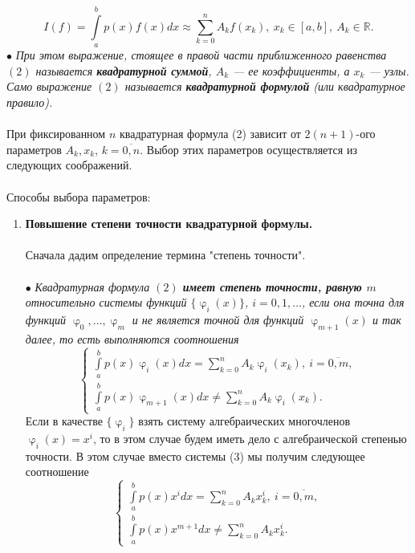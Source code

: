 \documentclass[a4paper, 12pt]{report}
\numberwithin{equation}{section}
\newcommand{\Rm}{\mathbb{R}}
\renewcommand{\varphi}{\upvarphi}
\begin{document}
	 \begin{equation}
	 	I (f) = \int\limits_a^b p(x) f(x)dx \approx \sum_{k=0}^{n}A_k f(x_k),\ x_k\in[a,b],\ A_k\in \Rm.
	 \end{equation}
	 $\bullet$ \textit{При этом выражение, стоящее в правой части приближенного равенства $(2)$ называется \textbf{квадратурной суммой}, $A_k$ --- ее коэффициенты, а $x_k$ --- узлы. Само выражение $(2)$ называется \textbf{квадратурной формулой} (или квадратурное правило).}\\\\
	 При фиксированном $n$ квадратурная формула (2) зависит от $2(n+1)$-ого параметров $A_k, x_k$, $k=\overline{0,n}$. Выбор этих параметров осуществляется из следующих соображений.\\\\
	 Способы выбора параметров:
	 \begin{enumerate}
	 	\item \textbf{Повышение степени точности квадратурной формулы.}\\\\
	 	Сначала дадим определение термина "степень точности".\\\\
	 	$\bullet$ \textit{Квадратурная формула $(2)$ \textbf{имеет степень точности, равную $m$} относительно системы функций $\{\varphi_i(x)\}$, $i=0,1,\ldots$, если она точна для функций $\varphi_0,\ldots, \varphi_m$ и не является точной для функций $\varphi_{m+1}(x)$ и так далее, то есть выполняются соотношения} 
	 	\begin{equation}
	 		\begin{cases}
	 	\int\limits_a^b p(x)\varphi_i(x) dx = \sum\limits_{k=0}^{n}A_k\varphi_i(x_k),\ i = \overline{0,m},\\
	 	\int\limits_a^b p(x)\varphi_{m+1}(x) dx\ne \sum\limits_{k=0}^{n}A_k\varphi_i(x_k).
	 	\end{cases}
	 	\end{equation}
	 	Если в качестве $\{\varphi_i\}$ взять систему алгебраических многочленов $\varphi_i(x) = x^i$, то в этом случае будем иметь дело с алгебраической степенью точности. В этом случае вместо системы (3) мы получим следующее соотношение 
	 	\begin{equation}
	 		\begin{cases}
	 		\int\limits_a^b p(x) x^idx = \sum\limits_{k=0}^{n}A_kx^i_k,\ i=\overline{0,m},\\
	 	\int\limits_a^b p(x) x^{m+1}dx \ne \sum\limits_{k=0}^{n}A_kx^i_k.
	 	\end{cases}

\end{equation}
\end{enumerate}
\end{document}
